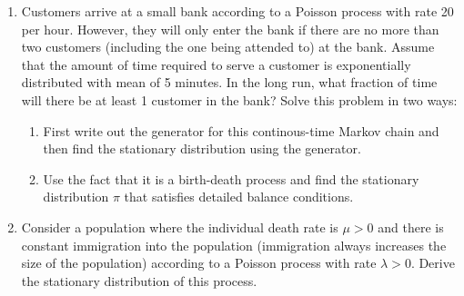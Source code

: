 \documentclass{article}
\begin{document}
\begin{enumerate}
\item Customers arrive at a small bank according to a Poisson process
  with rate 20 per hour. However, they will only enter the bank if
  there are no more than two customers (including the one being
  attended to) at the bank.  Assume that the amount of time required
  to serve a customer is exponentially distributed with mean of 5
  minutes. In the long run, what fraction of time will there be at
  least 1 customer in the bank? Solve this problem in two ways:
\begin{enumerate}
\item First write out the generator for this continous-time Markov
  chain and then find the stationary distribution using the generator.
\item Use the fact that it is a birth-death process and find the
  stationary distribution $\pi$ that satisfies detailed balance
  conditions.
\end{enumerate}
\item Consider a population where the individual death rate is $\mu>0$
  and there is constant immigration into the population (immigration
  always increases the size of the population) according to a Poisson
  process with rate $\lambda>0$.  Derive the stationary distribution of
  this process.

  \end{enumerate}
\end{document}
